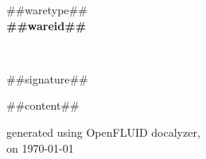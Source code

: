 \documentclass{##docstyle##}
\begin{document}
\begin{center}
  {##waretype##}\\
  \vspace{0.8em}
  {\huge \bfseries ##wareid##}\\
\end{center}\\
\vspace{1.5em}

##signature##

\vspace{1.5em}

##content##

\vspace{3em}

\small
\begin{flushright}generated using OpenFLUID docalyzer,\\
on \today\end{flushright}
\small
\end{document}
